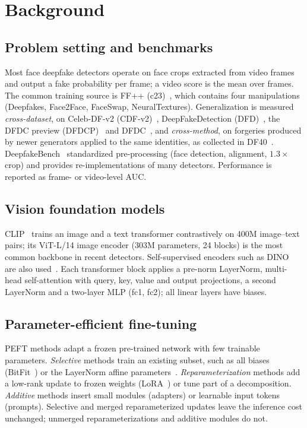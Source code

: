 \documentclass[fonts]{icst}
\begin{document}
\section{Background}
\label{sec:background}

\subsection{Problem setting and benchmarks}
Most face deepfake detectors operate on face crops extracted from video frames and output a fake probability per frame; a video score is the mean over frames. The common training source is FF++ (c23)~\cite{rossler2019ff}, which contains four manipulations (Deepfakes, Face2Face, FaceSwap, NeuralTextures). Generalization is measured \emph{cross-dataset}, on Celeb-DF-v2 (CDF-v2)~\cite{li2020celeb}, DeepFakeDetection (DFD)~\cite{dufour2019dfd}, the DFDC preview (DFDCP)~\cite{dolhansky2019dfdcp} and DFDC~\cite{dolhansky2020dfdc}, and \emph{cross-method}, on forgeries produced by newer generators applied to the same identities, as collected in DF40~\cite{yan2024df40}. DeepfakeBench~\cite{yan2023deepfakebench} standardized pre-processing (face detection, alignment, $1.3\times$ crop) and provides re-implementations of many detectors. Performance is reported as frame- or video-level AUC.

\subsection{Vision foundation models}
CLIP~\cite{radford2021clip_vitl} trains an image and a text transformer contrastively on 400M image--text pairs; its ViT-L/14 image encoder (303M parameters, 24 blocks) is the most common backbone in recent detectors. Self-supervised encoders such as DINO~\cite{caron2021emerging} are also used~\cite{zhang2026dino,zou2026clipdino}. Each transformer block applies a pre-norm LayerNorm, multi-head self-attention with query, key, value and output projections, a second LayerNorm and a two-layer MLP (fc1, fc2); all linear layers have biases.

\subsection{Parameter-efficient fine-tuning}
PEFT methods adapt a frozen pre-trained network with few trainable parameters. \emph{Selective} methods train an existing subset, such as all biases (BitFit~\cite{benzaken2022bitfit}) or the LayerNorm affine parameters~\cite{wang2022ln,giannou2023layernorm,valizadeh2024layernorm}. \emph{Reparameterization} methods add a low-rank update to frozen weights (LoRA~\cite{hu2022lora}) or tune part of a decomposition. \emph{Additive} methods insert small modules (adapters) or learnable input tokens (prompts). Selective and merged reparameterized updates leave the inference cost unchanged; unmerged reparameterizations and additive modules do not.
\end{document}
